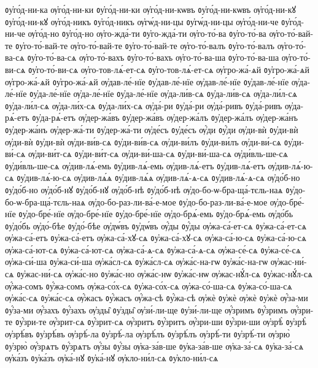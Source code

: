 {ᲂу҆го́д-ни-ка
ѹ҆го́д-ни-ки
ᲂу҆го́д-ни-ки
ѹ҆го́д-ни-кѡвъ
ᲂу҆го́д-ни-кѡвъ
ѹ҆го́д-ни-кꙋ
ᲂу҆го́д-ни-кꙋ
ѹ҆го́д-никъ
ᲂу҆го́д-никъ
ѹ҆гѡ́д-ни-цы
ᲂу҆гѡ́д-ни-цы
ѹ҆го́д-ни-че
ᲂу҆го́д-ни-че
ѹ҆го́д-но
ᲂу҆го́д-но
ѹ҆го-жда́-ти
ᲂу҆го-жда́-ти
ѹ҆го-то́-ва
ᲂу҆го-то́-ва
ѹ҆го-то́-вай-те
ᲂу҆го-то́-вай-те
ѹ҆го-то́-вай-те
ᲂу҆го-то́-вай-те
ѹ҆го-то́-валъ
ᲂу҆го-то́-валъ
ѹ҆го-то́-ва-сѧ
ᲂу҆го-то́-ва-сѧ
ѹ҆го-то́-вахъ
ᲂу҆го-то́-вахъ
ѹ҆го-то́-ва-ша
ᲂу҆го-то́-ва-ша
ѹ҆го-то́-ви-сѧ
ᲂу҆го-то́-ви-сѧ
ѹ҆го-тов-лѧ́-ет-сѧ
ᲂу҆го-тов-лѧ́-ет-сѧ
ѹ҆гро-жа́-ѧй
ᲂу҆гро-жа́-ѧй
ѹ҆гро-жа́-ѧй
ᲂу҆гро-жа́-ѧй
ѹ҆дав-ле́-нїе
ᲂу҆дав-ле́-нїе
ѹ҆дав-ле́-нїе
ᲂу҆дав-ле́-нїе
ѹ҆да-ле́-нїе
ᲂу҆да-ле́-нїе
ѹ҆да-ле́-нїе
ᲂу҆да-ле́-нїе
ѹ҆да-ли́в-сѧ
ᲂу҆да-ли́в-сѧ
ѹ҆да-ли́л-сѧ
ᲂу҆да-ли́л-сѧ
ѹ҆да-ли́х-сѧ
ᲂу҆да-ли́х-сѧ
ѹ҆да́-ри
ᲂу҆да́-ри
ѹ҆да́-ривъ
ᲂу҆да́-ривъ
ѹ҆да-рѧ́-етъ
ᲂу҆да-рѧ́-етъ
ѹ҆дер-жа́въ
ᲂу҆дер-жа́въ
ѹ҆дер-жа́лъ
ᲂу҆дер-жа́лъ
ѹ҆дер-жа́нъ
ᲂу҆дер-жа́нъ
ѹ҆дер-жа́-ти
ᲂу҆дер-жа́-ти
ѹ҆де́съ
ᲂу҆де́съ
ѹ҆́ди
ᲂу҆́ди
ѹ҆ди-вѝ
ᲂу҆ди-вѝ
ѹ҆ди-вѝ
ᲂу҆ди-вѝ
ѹ҆ди-ви́в-сѧ
ᲂу҆ди-ви́в-сѧ
ѹ҆ди-ви́лъ
ᲂу҆ди-ви́лъ
ѹ҆ди-ви́-сѧ
ᲂу҆ди-ви́-сѧ
ѹ҆ди-ви́т-сѧ
ᲂу҆ди-ви́т-сѧ
ѹ҆ди-ви́-ша-сѧ
ᲂу҆ди-ви́-ша-сѧ
ѹ҆ди́вль-ше-сѧ
ᲂу҆ди́вль-ше-сѧ
ѹ҆див-лѧ́-емь
ᲂу҆див-лѧ́-емь
ѹ҆див-лѧ́-етъ
ᲂу҆див-лѧ́-етъ
ѹ҆див-лѧ́-ю-сѧ
ᲂу҆див-лѧ́-ю-сѧ
ѹ҆див-лѧ́ѧ
ᲂу҆див-лѧ́ѧ
ѹ҆див-лѧ́-ѧ-сѧ
ᲂу҆див-лѧ́-ѧ-сѧ
ѹ҆до́б-но
ᲂу҆до́б-но
ѹ҆до́б-нꙋ
ᲂу҆до́б-нꙋ
ѹ҆до́б-нѣ
ᲂу҆до́б-нѣ
ѹ҆до-бо-ѡ-бра-ща́-тєль-наѧ
ᲂу҆до-бо-ѡ-бра-ща́-тєль-наѧ
ѹ҆до-бо-раз-ли-ва́-е-мое
ᲂу҆до-бо-раз-ли-ва́-е-мое
ѹ҆до-бре́-нїе
ᲂу҆до-бре́-нїе
ѹ҆до-бре́-нїе
ᲂу҆до-бре́-нїе
ѹ҆до-брѧ́-емь
ᲂу҆до-брѧ́-емь
ѹ҆до́бь
ᲂу҆до́бь
ѹ҆до́-бѣе
ᲂу҆до́-бѣе
ѹ҆дѡ́въ
ᲂу҆дѡ́въ
ѹ҆́ды
ᲂу҆́ды
ѹ҆жа-са́-ет-сѧ
ᲂу҆жа-са́-ет-сѧ
ѹ҆жа-са́-етъ
ᲂу҆жа-са́-етъ
ѹ҆жа-са́-хꙋ-сѧ
ᲂу҆жа-са́-хꙋ-сѧ
ѹ҆жа-са́-ю-сѧ
ᲂу҆жа-са́-ю-сѧ
ѹ҆жа-са́-ют-сѧ
ᲂу҆жа-са́-ют-сѧ
ѹ҆жа-са́-ѧ-сѧ
ᲂу҆жа-са́-ѧ-сѧ
ѹ҆жа-се́-сѧ
ᲂу҆жа-се́-сѧ
ѹ҆жа-си́-ша
ᲂу҆жа-си́-ша
ѹ҆жа́сл-сѧ
ᲂу҆жа́сл-сѧ
ѹ҆жа́с-на-гѡ
ᲂу҆жа́с-на-гѡ
ѹ҆жас-ни́-сѧ
ᲂу҆жас-ни́-сѧ
ѹ҆жа́с-но
ᲂу҆жа́с-но
ѹ҆жа́с-нѡ
ᲂу҆жа́с-нѡ
ѹ҆жас-нꙋ́л-сѧ
ᲂу҆жас-нꙋ́л-сѧ
ѹ҆́жа-сомъ
ᲂу҆́жа-сомъ
ѹ҆жа-со́х-сѧ
ᲂу҆жа-со́х-сѧ
ѹ҆жа-со́-ша-сѧ
ᲂу҆жа-со́-ша-сѧ
ѹ҆жа́с-сѧ
ᲂу҆жа́с-сѧ
ѹ҆́жасъ
ᲂу҆́жасъ
ѹ҆́жа-сѣ
ᲂу҆́жа-сѣ
ѹ҆жѐ
ᲂу҆жѐ
ѹ҆жѐ
ᲂу҆жѐ
ѹ҆́за-ми
ᲂу҆́за-ми
ѹ҆́захъ
ᲂу҆́захъ
ѹ҆зды̑
ᲂу҆зды̑
ѹ҆зи́-ли-ще
ᲂу҆зи́-ли-ще
ѹ҆́зримъ
ᲂу҆́зримъ
ѹ҆́зри-те
ᲂу҆́зри-те
ѹ҆́зрит-сѧ
ᲂу҆́зрит-сѧ
ѹ҆́зритъ
ᲂу҆́зритъ
ѹ҆́зри-ши
ᲂу҆́зри-ши
ѹ҆зрѣ̀
ᲂу҆зрѣ̀
ѹ҆зрѣ́въ
ᲂу҆зрѣ́въ
ѹ҆зрѣ́-ла
ᲂу҆зрѣ́-ла
ѹ҆зрѣ́лъ
ᲂу҆зрѣ́лъ
ѹ҆зрѣ́-ти
ᲂу҆зрѣ́-ти
ѹ҆зрю̀
ᲂу҆зрю̀
ѹ҆́зрѧтъ
ᲂу҆́зрѧтъ
ѹ҆́зы
ᲂу҆́зы
ѹ҆ка-за́в-ше
ᲂу҆ка-за́в-ше
ѹ҆ка-за́-сѧ
ᲂу҆ка-за́-сѧ
ѹ҆ка́зъ
ᲂу҆ка́зъ
ѹ҆ка́-нꙋ
ᲂу҆ка́-нꙋ
ѹ҆кло-ни́л-сѧ
ᲂу҆кло-ни́л-сѧ
}
